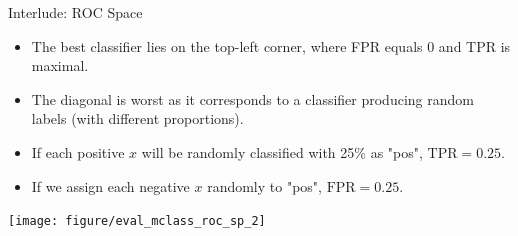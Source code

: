 \begin{vbframe}{Interlude: ROC Space}
	
	\begin{itemize}
		\item The best classifier lies on the top-left corner, where FPR equals 0 and 
		TPR is maximal.
		\item The diagonal is worst as it corresponds to a classifier producing random 
		labels (with different proportions). 
	\end{itemize}
	
	\lz
	
	\begin{minipage}[c]{0.5\textwidth}
		\begin{itemize}
			\item If each positive $x$ will be randomly classified 
			with 25\% as "pos", $\text{TPR} = 0.25$.
			\item If we assign each negative $x$ randomly to "pos", $\text{FPR} = 0.25$.

		\end{itemize}
	\end{minipage}%
	\begin{minipage}[c]{0.5\textwidth}
		\centering \texttt{[image: figure/eval\_mclass\_roc\_sp\_2]}
	\end{minipage}
	
\end{vbframe}



